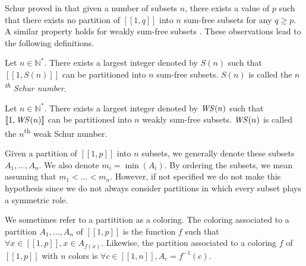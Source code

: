 \par
Schur proved in \cite{Schur1917} that given a number of subsets \(n\), there exists a value of \(p\)
such that there exists no partition of \([\![1,q]\!]\) into \(n\) sum-free subsets for any \(q \geqslant p\). A similar
property holds for weakly sum-free subsets \cite{Irving1973}. These observations lead to the following definitions.

\begin{definition}
Let \(n \in \mathbb{N}^*\). There exists a largest integer denoted by \(S(n)\) such that \([\![1, S(n)]\!]\) can be
 partitioned into \(n\) sum-free subsets. \(S(n)\) is called the \textit{\(n\)\textsuperscript{th} Schur number}.
\end{definition}

\begin{definition}
Let \(n \in \mathbb{N}^*\). There exists a largest integer denoted by \(\mathit{WS} (n)\) such that \([\![1, \mathit{WS} (n)]\!]\) 
can be partitioned into \(n\) weakly sum-free subsets. \(\mathit{WS}(n)\) is called the \(n\)\textsuperscript{th} weak Schur 
number.
\end{definition}

Given a partition of \([\![1, p]\!]\) into \(n\) subsets, we generally denote these subsets \(A_1, ..., A_n\). We also denote
\(m_i = \min(A_i)\). By ordering the subsets, we mean assuming that \(m_1 < ... < m_n\). However, if not specified we do 
not make this hypothesis since we do not always consider partitions in which every subset plays a symmetric role.

\begin{definition}
We sometimes refer to a partitition as a coloring. The coloring associated to a partition \(A_1, ..., A_n\) of 
\([\![1, p]\!]\) is the function \(f\) such that \(\forall x \in [\![1, p]\!], x \in A_{f(x)}\). Likewise, the partition associated to
a coloring \(f\) of \([\![1, p]\!]\) with \(n\) colors is \(\forall c \in [\![1, n]\!], A_c = f^{-1}(c)\).
\end{definition}
